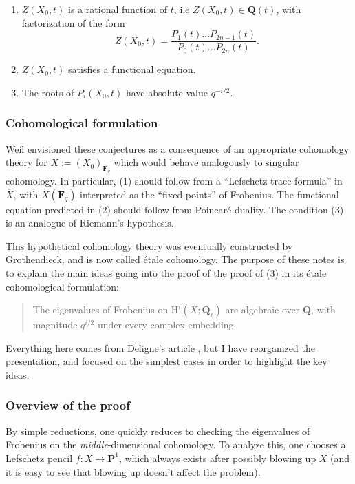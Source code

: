 \documentclass[letterpaper,11pt]{article}
\newcommand{\F}{\mathbf{F}}
\newcommand{\Q}{\mathbf{Q}}
\newcommand{\ol}[1]{\overline{#1}}
\newcommand{\PS}{\mathbf{P}}
\DeclareMathOperator{\et}{\acute{e}t}
\newcommand{\mrm}[1]{\mathrm{#1}}
\begin{document}
\begin{conj}[Weil]  \text{} 

\begin{enumerate}
\item $Z(X_0, t)$ is a rational function of $t$, i.e $Z(X_0,t) \in \Q(t)$, with factorization of the form
\[
Z(X_0,t) = \frac{P_1 (t) \ldots P_{2n-1}(t)}{P_0(t) \ldots P_{2n}(t)}.
\]
\item $Z(X_0,t)$ satisfies a functional equation. 
\item The roots of $P_i(X_0,t)$ have absolute value $q^{-i/2}$. 
\end{enumerate}
\end{conj}

\subsubsection{Cohomological formulation}

Weil envisioned these conjectures as a consequence of an appropriate cohomology theory for $X := (X_0)_{\ol{\F}_q}$ which would behave analogously to singular cohomology. In particular, (1) should follow from a ``Lefschetz trace formula'' in $\ol{X}$, with $X(\F_q)$ interpreted as the ``fixed points'' of Frobenius. The functional equation predicted in (2) should follow from Poincar\'{e} duality. The condition (3) is an analogue of Riemann's hypothesis. 

This hypothetical cohomology theory was eventually constructed by Grothendieck, and is now called \'{e}tale cohomology. The purpose of these notes is to explain the main ideas going into the proof of the proof of (3) in its \'{e}tale cohomological formulation:
\begin{quotation}
The eigenvalues of Frobenius on $\mrm{H}^i_{\et}(X; \Q_{\ell})$ are algebraic over $\Q$, with magnitude $q^{i/2}$ under every complex embedding. 
\end{quotation}
Everything here comes from Deligne's article \cite{weil-i}, but I have reorganized the presentation, and focused on the simplest cases in order to highlight the key ideas. 


\subsubsection{Overview of the proof}
 By simple reductions, one quickly reduces to checking the eigenvalues of Frobenius on the \emph{middle}-dimensional cohomology. To analyze this, one chooses a Lefschetz pencil $f \colon X \rightarrow \PS^1$, which always exists after possibly blowing up $X$ (and it is easy to see that blowing up doesn't affect the problem). 
\end{document}

